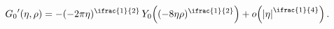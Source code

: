 \[\mathop{G_{0}\/}\nolimits'\!\left(\eta,\rho\right)=-(-2\pi\eta)^{\ifrac{1}{2}}%
\mathop{Y_{0}\/}\nolimits\!\left((-8\eta\rho)^{\ifrac{1}{2}}\right)+\mathop{o%
\/}\nolimits\!\left(\left|\eta\right|^{\ifrac{1}{4}}\right).\]